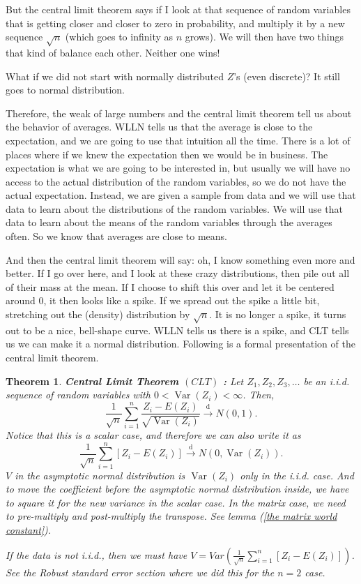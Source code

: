 \documentclass[11pt,a4paper]{amsart}
\theoremstyle{plain}
\newtheorem{theorem}{Theorem}
\theoremstyle{definition}
\begin{document}
	But the central limit theorem says if I look at that sequence of random variables that is getting closer and closer to zero in probability, and multiply it by a new sequence $\sqrt{n}$ (which goes to infinity as $n$ grows). We will then have two things that kind of balance each other. Neither one wins!\par 
	What if we did not start with normally distributed $Z$'s (even discrete)? It still goes to normal distribution.\par 
	Therefore, the weak of large numbers and the central limit theorem tell us about the behavior of averages. WLLN tells us that the average is close to the expectation, and we are going to use that intuition all the time. There is a lot of places where if we knew the expectation then we would be in business. The expectation is what we are going to be interested in, but usually we will have no access to the actual distribution of the random variables, so we do not have the actual expectation. Instead, we are given a sample from data and we will use that data to learn about the distributions of the random variables. We will use that data to learn about the means of the random variables through the averages often. So we know that averages are close to means.\par 
	And then the central limit theorem will say: oh, I know something even more and better. If I go over here, and I look at these crazy distributions, then pile out all of their mass at the mean. If I choose to shift this over and let it be centered around $0$, it then looks like a spike. If we spread out the spike a little bit, stretching out the (density) distribution by $\sqrt{n}$. It is no longer a spike, it turns out to be a nice, bell-shape curve.  WLLN tells us there is a spike, and CLT tells us we can make it a normal distribution. Following is a formal presentation of the central limit theorem.
	\begin{theorem}
		\textbf{Central Limit Theorem $(C L T)$ :} Let $Z_{1}, Z_{2}, Z_{3}, \ldots$ be an i.i.d. sequence of random variables with $0<\operatorname{Var}\left(Z_{i}\right)<\infty$. Then,
		\[
		\frac{1}{\sqrt{n}} \sum_{i=1}^{n} \frac{Z_{i}-E\left(Z_{i}\right)}{\sqrt{\operatorname{Var}\left(Z_{i}\right)}} \stackrel{\mathrm{d}}{\longrightarrow} N(0,1) .
		\]
		Notice that this is a scalar case, and therefore we can also write it as 
			\[
		\frac{1}{\sqrt{n}} \sum_{i=1}^{n} [Z_{i}-E\left(Z_{i}\right)] \stackrel{\mathrm{d}}{\longrightarrow} N(0,\operatorname{Var}\left(Z_{i}\right)) .
		\]
		$V$ in the asymptotic normal distribution is $\operatorname{Var}\left(Z_{i}\right)$ only in the i.i.d. case. And to move the coefficient before the asymptotic normal distribution inside, we have to square it for the new variance in the scalar case. In the matrix case, we need to pre-multiply and post-multiply the transpose. See lemma (\ref{the matrix world constant}). \par 
		If the data is not i.i.d., then we must have $V = Var(	\frac{1}{\sqrt{n}} \sum_{i=1}^{n} [Z_{i}-E\left(Z_{i}\right)])$. See the Robust standard error section where we did this for the $n=2$ case. 
	\end{theorem}
\end{document}
